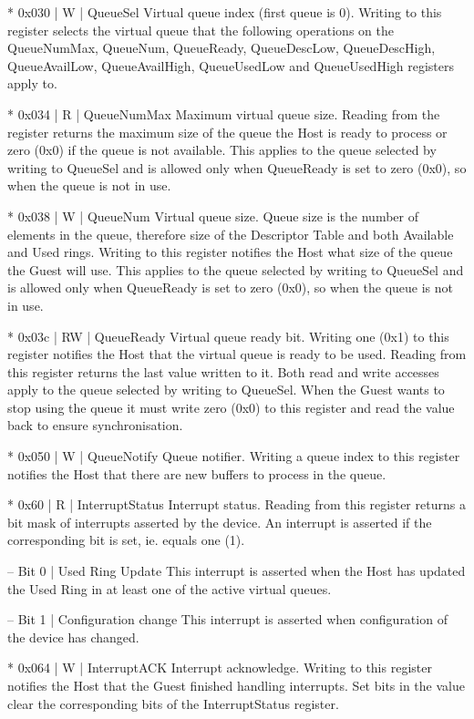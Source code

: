 * 0x030 | W | QueueSel
  Virtual queue index (first queue is 0).
  Writing to this register selects the virtual queue that the
  following operations on the QueueNumMax, QueueNum, QueueReady,
  QueueDescLow, QueueDescHigh, QueueAvailLow, QueueAvailHigh,
  QueueUsedLow and QueueUsedHigh registers apply to.

* 0x034 | R | QueueNumMax
  Maximum virtual queue size.
  Reading from the register returns the maximum size of the queue
  the Host is ready to process or zero (0x0) if the queue is not
  available. This applies to the queue selected by writing to
  QueueSel and is allowed only when QueueReady is set to zero
  (0x0), so when the queue is not in use.

* 0x038 | W | QueueNum
  Virtual queue size.
  Queue size is the number of elements in the queue, therefore size
  of the Descriptor Table and both Available and Used rings.
  Writing to this register notifies the Host what size of the
  queue the Guest will use. This applies to the queue selected by
  writing to QueueSel and is allowed only when QueueReady is set
  to zero (0x0), so when the queue is not in use.

* 0x03c | RW | QueueReady
  Virtual queue ready bit.
  Writing one (0x1) to this register notifies the Host that the
  virtual queue is ready to be used. Reading from this register
  returns the last value written to it. Both read and write
  accesses apply to the queue selected by writing to QueueSel.
  When the Guest wants to stop using the queue it must write
  zero (0x0) to this register and read the value back to
  ensure synchronisation.

* 0x050 | W | QueueNotify
  Queue notifier.
  Writing a queue index to this register notifies the Host that
  there are new buffers to process in the queue.

* 0x60 | R | InterruptStatus
  Interrupt status.
  Reading from this register returns a bit mask of interrupts
  asserted by the device. An interrupt is asserted if the
  corresponding bit is set, ie. equals one (1).

  – Bit 0 | Used Ring Update
    This interrupt is asserted when the Host has updated the Used
    Ring in at least one of the active virtual queues.

  – Bit 1 | Configuration change
    This interrupt is asserted when configuration of the device has
    changed.

* 0x064 | W | InterruptACK
  Interrupt acknowledge.
  Writing to this register notifies the Host that the Guest
  finished handling interrupts. Set bits in the value clear
  the corresponding bits of the InterruptStatus register.

